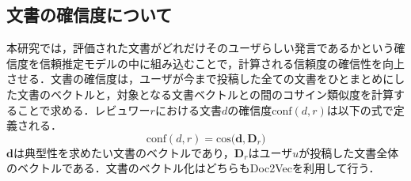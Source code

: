 \documentclass[a4paper,11pt,oneside,openany]{jsbook}
\begin{document}
	\subsection{文書の確信度について}
\label{subsec:p}
本研究では，評価された文書がどれだけそのユーザらしい発言であるかという確信度を信頼推定モデルの中に組み込むことで，計算される信頼度の確信性を向上させる．文書の確信度は，ユーザが今まで投稿した全ての文書をひとまとめにした文書のベクトルと，対象となる文書ベクトルとの間のコサイン類似度を計算することで求める．レビュワー$r$における文書$d$の確信度$\mathrm{conf}(d , r)$は以下の式で定義される．
\begin{equation}
\mathrm{conf}(d, r) = \mathrm{cos}\bigl(\mathbf{d}, \mathbf{D}_r\bigr)
\end{equation}
$\mathbf{d}$は典型性を求めたい文書のベクトルであり，$\mathbf{D}_r$はユーザ$u$が投稿した文書全体のベクトルである．文書のベクトル化はどちらもDoc2Vecを利用して行う．
\end{document}
